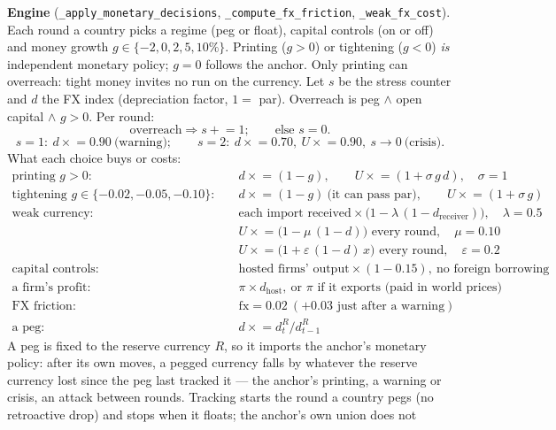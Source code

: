 \documentclass[11pt]{article}
\newcommand{\code}[1]{\texttt{#1}}
\begin{document}
\textbf{Engine} (\code{\_apply\_monetary\_decisions}, \code{\_compute\_fx\_friction},
\code{\_weak\_fx\_cost}). Each round a country picks a regime (peg or float), capital
controls (on or off) and money growth $g\in\{-2,0,2,5,10\%\}$. Printing ($g>0$)
or tightening ($g<0$) \emph{is} independent monetary policy; $g=0$ follows the
anchor. Only printing can overreach: tight money invites no run on the currency. Let $s$ be the
stress counter and $d$ the FX index (depreciation factor, $1=$ par). Overreach is
peg $\wedge$ open capital $\wedge$ $g>0$. Per round:
\[
\text{overreach} \Rightarrow s \mathrel{+}= 1; \qquad \text{else } s = 0 .
\]
\[
s = 1:\ d \mathrel{\times}= 0.90\ \text{(warning)};\qquad
s = 2:\ d \mathrel{\times}= 0.70,\ U \mathrel{\times}= 0.90,\ s \to 0\ \text{(crisis)} .
\]
What each choice buys or costs:
\begin{align*}
\text{printing } g>0:&\quad d \mathrel{\times}= (1-g), \qquad
  U \mathrel{\times}= (1 + \sigma\, g\, d), \quad \sigma = 1 \\
\text{tightening } g\in\{-0.02,-0.05,-0.10\}:&\quad d \mathrel{\times}= (1-g) \ \text{(it can pass par)},
  \qquad U \mathrel{\times}= (1 + \sigma\, g) \\
\text{weak currency:}&\quad \text{each import received} \times
  \big(1 - \lambda\,(1-d_{\text{receiver}})\big), \quad \lambda = 0.5 \\
  &\quad U \mathrel{\times}= \big(1 - \mu\,(1-d)\big) \text{ every round}, \quad \mu = 0.10 \\
  &\quad U \mathrel{\times}= \big(1 + \varepsilon\,(1-d)\,x\big) \text{ every round}, \quad \varepsilon = 0.2 \\
\text{capital controls:}&\quad \text{hosted firms' output} \times (1-0.15),
  \ \text{no foreign borrowing} \\
\text{a firm's profit:}&\quad \pi \times d_{\text{host}}, \ \text{or } \pi \text{ if it exports (paid in world prices)} \\
\text{FX friction:}&\quad \mathrm{fx} = 0.02 \ (+0.03 \text{ just after a warning}) \\
\text{a peg:}&\quad d \mathrel{\times}= d^{R}_{t} / d^{R}_{t-1}
\end{align*}
A peg is fixed to the reserve currency $R$, so it imports the anchor's monetary
policy: after its own moves, a pegged currency falls by whatever the reserve
currency lost since the peg last tracked it --- the anchor's printing, a warning
or crisis, an attack between rounds. Tracking starts the round a country pegs
(no retroactive drop) and stops when it floats; the anchor's own union does not
\end{document}
